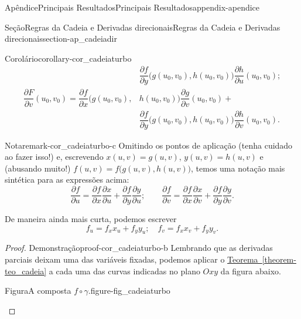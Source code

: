 \documentclass[oneside,10pt,]{book}
\newcommand{\xreffont}{\relax}
\numberwithin{equation}{section}
\begin{document}
\begin{appendixptx}{Apêndice}{Principais Resultados}{}{Principais Resultados}{}{}{appendix-apendice}
\begin{sectionptx}{Seção}{Regras da Cadeia e Derivadas direcionais}{}{Regras da Cadeia e Derivadas direcionais}{}{}{section-ap_cadeiadir}
\begin{corollary}{Corolário}{}{}{corollary-cor_cadeiaturbo}
\begin{align*}
&\dfrac{\partial f}{\partial
y}\big(g(u_0,v_0),h(u_0,v_0)\big)\dfrac{\partial h}{\partial
u}(u_0,v_0);\\
\dfrac{\partial F}{\partial v}(u_0,v_0)
=\dfrac{\partial f}{\partial
x}\big(g(u_0,v_0),&h(u_0,v_0)\big)\dfrac{\partial g}{\partial
v}(u_0,v_0)+\\
&
\dfrac{\partial f}{\partial
y}\big(g(u_0,v_0),h(u_0,v_0)\big)\dfrac{\partial h}{\partial
v}(u_0,v_0).
\end{align*}
\begin{remark}{Nota}{}{remark-cor_cadeiaturbo-c}%
Omitindo os pontos de aplicação (tenha cuidado ao fazer isso!) e, escrevendo \(x(u,v)=g(u,v)\), \(y(u,v)=h(u,v)\) e (abusando muito!) \(f(u,v)=f\big(g(u,v),h(u,v)\big)\), temos uma notação mais sintética para as expressões acima:%
\begin{equation*}
\dfrac{\partial f}{\partial u}=\dfrac{\partial f}{\partial x}
\dfrac{\partial x}{\partial u}+\dfrac{\partial f}{\partial y}
\dfrac{\partial y}{\partial u};\qquad
\dfrac{\partial f}{\partial v}=\dfrac{\partial f}{\partial x}
\dfrac{\partial x}{\partial v}+\dfrac{\partial f}{\partial y}
\dfrac{\partial y}{\partial v}.
\end{equation*}
%
\par
De maneira ainda mais curta, podemos escrever%
\begin{equation}
f_u=f_x x_u+f_y y_u;\quad f_v=f_x x_v+f_y
y_v.\label{men-eq_gradparc}
\end{equation}
%
\end{remark}
\end{corollary}
\begin{proof}{Demonstração}{}{proof-cor_cadeiaturbo-b}
Lembrando que as derivadas parciais deixam uma das variáveis fixadas, podemos aplicar o \hyperref[theorem-teo_cadeia]{Teorema~{\xreffont\ref{theorem-teo_cadeia}}} a cada uma das curvas indicadas no plano \(Oxy\) da figura abaixo. \begin{figureptx}{Figura}{A composta \(f\circ\gamma\).}{figure-fig_cadeiaturbo}{}%
\begin{image}{0.05}{0.9}{0.05}{}%
\end{image}
\end{figureptx}
\end{proof}
\end{sectionptx}
\end{appendixptx}
\end{document}
